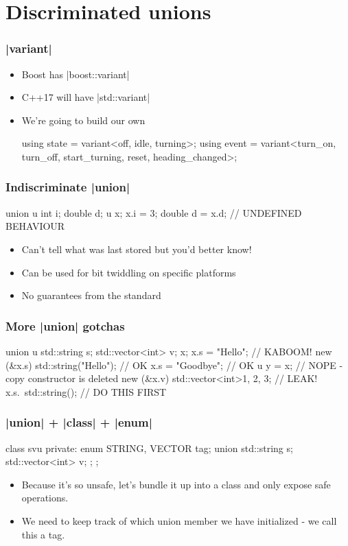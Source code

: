 \documentclass[aspectratio=169]{beamer}
\begin{document}
\section{Discriminated unions}

\begin{frame}[fragile]
  \frametitle{\cpp|variant|}
  \begin{itemize}
  \item Boost has \cpp|boost::variant|
  \item C++17 will have \cpp|std::variant|
  \item We're going to build our own
\begin{cppcode}
using state = variant<off, idle, turning>;
using event =
    variant<turn_on, turn_off, start_turning, reset,
            heading_changed>;
\end{cppcode}
  \end{itemize}
\end{frame}

\begin{frame}[fragile]
  \frametitle{Indiscriminate \cpp|union|}
\begin{cppcode}
    union u {
      int i;
      double d;
    }
    u x;
    x.i = 3;
    double d = x.d; // UNDEFINED BEHAVIOUR
\end{cppcode}
  \begin{itemize}
  \item Can't tell what was last stored but you'd better know!
  \item Can be used for bit twiddling on specific platforms
  \item No guarantees from the standard
  \end{itemize}
\end{frame}

\begin{frame}[fragile]
  \frametitle{More \cpp|union| gotchas}
\begin{cppcode}
union u {
  std::string s;
  std::vector<int> v;
} x;
x.s = "Hello"; // KABOOM!
new (&x.s) std::string("Hello"); // OK
x.s = "Goodbye"; // OK
u y = x; // NOPE - copy constructor is deleted
new (&x.v) std::vector<int>{1, 2, 3}; // LEAK!
x.s.~std::string(); // DO THIS FIRST
\end{cppcode}
\end{frame}

\begin{frame}[fragile]
  \frametitle{\cpp|union| + \cpp|class| + \cpp|enum|}
\begin{cppcode}
class svu {
 private:
  enum { STRING, VECTOR } tag;
  union {
    std::string s;
    std::vector<int> v;
  };
};
\end{cppcode}
  \begin{itemize}
  \item Because it's so unsafe, let's bundle it up into a class and only expose
    safe operations.
  \item We need to keep track of which union member we have initialized - we
    call this a \alert{tag}.
  \end{itemize}
\end{frame}
\end{document}
